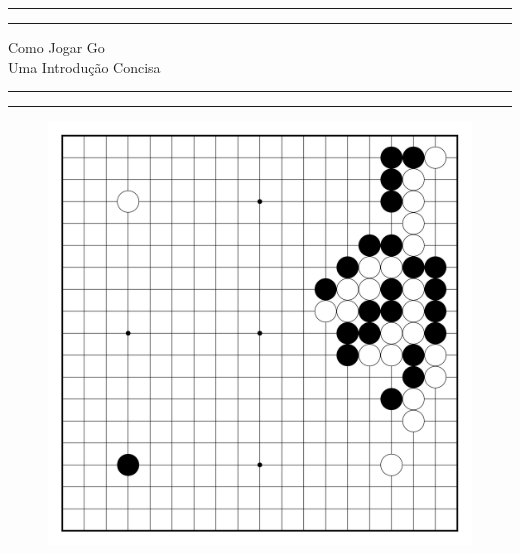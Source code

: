 \documentclass[11pt,twoside,openany,svgnames,x11names]{book}
\begin{document}
  \frontmatter

  \begin{titlepage}

      \centering
      
      \scshape %

      \vspace*{-1.5cm}
      
      
      \rule{\textwidth}{1.6pt}\vspace*{-\baselineskip}\vspace*{2pt}
      \rule{\textwidth}{0.4pt}
      
      \vspace{0.7\baselineskip}
      
      \Huge{Como Jogar Go}\\
      \vspace*{10pt}
      \LARGE{Uma Introdução Concisa}
      
      \vspace{0.275\baselineskip}
      
      \rule{\textwidth}{0.4pt}\vspace*{-\baselineskip}\vspace{3.2pt}
      \rule{\textwidth}{1.6pt}

      
      \vspace*{.4cm}

      \begin{figure}[h]
          \centering
          \includegraphics[scale=.9]{../images/AncientGameNaoNumerado.png}
      \end{figure}


\end{titlepage}
\end{document}
